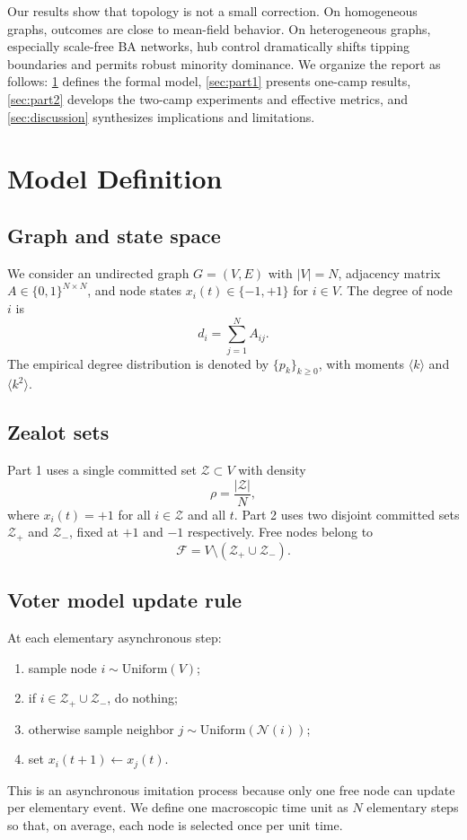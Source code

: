 \documentclass[12pt, a4paper]{article}
\begin{document}
Our results show that topology is not a small correction. On homogeneous graphs, outcomes are close to mean-field behavior. On heterogeneous graphs, especially scale-free BA networks, hub control dramatically shifts tipping boundaries and permits robust minority dominance. We organize the report as follows: \cref{sec:model} defines the formal model, \cref{sec:part1} presents one-camp results, \cref{sec:part2} develops the two-camp experiments and effective metrics, and \cref{sec:discussion} synthesizes implications and limitations.

\section{Model Definition}\label{sec:model}
\subsection{Graph and state space}
We consider an undirected graph $G=(V,E)$ with $|V|=N$, adjacency matrix $A\in\{0,1\}^{N\times N}$, and node states $x_i(t)\in\{-1,+1\}$ for $i\in V$. The degree of node $i$ is
\begin{equation}\label{eq:degree_def}
d_i = \sum_{j=1}^N A_{ij}.
\end{equation}
The empirical degree distribution is denoted by $\{p_k\}_{k\ge 0}$, with moments $\langle k \rangle$ and $\langle k^2 \rangle$.

\subsection{Zealot sets}
Part 1 uses a single committed set $\mathcal{Z}\subset V$ with density
\begin{equation}\label{eq:rho_single}
\rho = \frac{|\mathcal{Z}|}{N},
\end{equation}
where $x_i(t)=+1$ for all $i\in\mathcal{Z}$ and all $t$. Part 2 uses two disjoint committed sets $\mathcal{Z}_+$ and $\mathcal{Z}_-$, fixed at $+1$ and $-1$ respectively. Free nodes belong to
\begin{equation}\label{eq:free_set}
\mathcal{F} = V\setminus(\mathcal{Z}_+\cup\mathcal{Z}_-).
\end{equation}

\subsection{Voter model update rule}
At each elementary asynchronous step:
\begin{enumerate}[label=\arabic*.]
\item sample node $i\sim\mathrm{Uniform}(V)$;
\item if $i\in\mathcal{Z}_+\cup\mathcal{Z}_-$, do nothing;
\item otherwise sample neighbor $j\sim\mathrm{Uniform}(\mathcal{N}(i))$;
\item set $x_i(t+1)\leftarrow x_j(t)$.
\end{enumerate}
This is an asynchronous imitation process because only one free node can update per elementary event. We define one macroscopic time unit as $N$ elementary steps so that, on average, each node is selected once per unit time.
\end{document}
